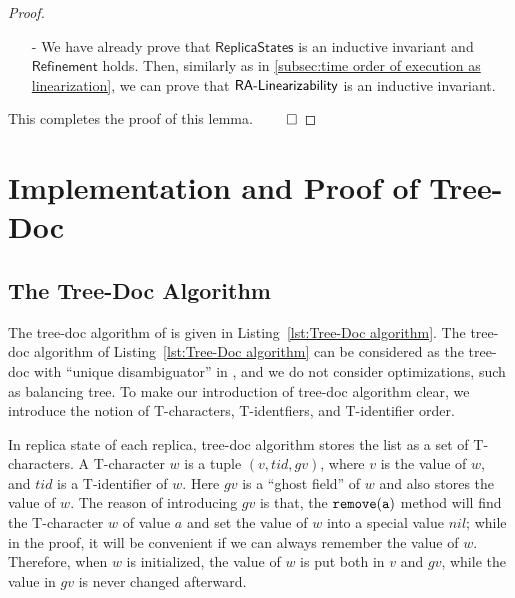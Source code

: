 \begin {proof}
\begin{itemize}
\begin{itemize}
    \item[-] Assume we do $\alabellong[{\tt read}]{}{s}{}$ on replica state $\sigma$. Assume $\sigma = w_1 \cdot \ldots \cdot w_n$, and for each $i$, $w_i = (id_i,v_i,degree_i,flag_i)$. Then, $s$ is the projection of $v_1 \cdot \ldots \cdot v_n$ into values with flag $\mathit{true}$. Assume $\refmap(\sigma) = (l,T)$. We can see that $l = v_1 \cdot \ldots \cdot v_n$ and $T = \{ v_i \vert flag_i = \mathit{false} \}$. Thus, we have $\refmap(\sigma) \specarrow{\alabellong[{\tt read}]{}{s}{}} \refmap(\sigma)$.
    \end{itemize}

\item[-] We have already prove that $\mathsf{ReplicaStates}$ is an inductive invariant and $\mathsf{Refinement}$ holds. Then, similarly as in \sectionautorefname \ref{subsec:time order of execution as linearization}, we can prove that $\mathsf{RA\text{-}Linearizability{}}$ is an inductive invariant.
\end{itemize}

This completes the proof of this lemma. $\qed$
\end {proof}









\section{Implementation and Proof of Tree-Doc}
\label{sec:implementation and proof of tree-doc}


\subsection{The Tree-Doc Algorithm}
\label{subsec:the Tree-Doc algorithm}

The tree-doc algorithm of \cite{DBLP:conf/icdcs/PreguicaMSL09,DBLP:journals/corr/abs-0710-1784} is given in Listing~\ref{lst:Tree-Doc algorithm}. The tree-doc algorithm of Listing~\ref{lst:Tree-Doc algorithm} can be considered as the tree-doc with ``unique disambiguator'' in \cite{DBLP:conf/icdcs/PreguicaMSL09,DBLP:journals/corr/abs-0710-1784}, and we do not consider optimizations, such as balancing tree. To make our introduction of tree-doc algorithm clear, we introduce the notion of T-characters, T-identfiers, and T-identifier order.

In replica state of each replica, tree-doc algorithm stores the list as a set of T-characters. A T-character $w$ is a tuple $(v,tid,gv)$, where $v$ is the value of $w$, and $tid$ is a T-identifier of $w$. Here $gv$ is a ``ghost field'' of $w$ and also stores the value of $w$. The reason of introducing $gv$ is that, the $\alabelshort[{\tt remove}]{a}$ method will find the T-character $w$ of value $a$ and set the value of $w$ into a special value $nil$; while in the proof, it will be convenient if we can always remember the value of $w$. Therefore, when $w$ is initialized, the value of $w$ is put both in $v$ and $gv$, while the value in $gv$ is never changed afterward.

